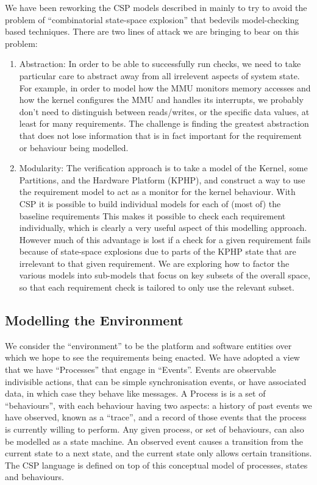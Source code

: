 We have been reworking the CSP models described in \cite{KH-MCS2016}
mainly to try to avoid the problem of ``combinatorial state-space explosion''
that bedevils model-checking based techniques.
There are two lines of attack we are bringing to bear on this problem:
\begin{enumerate}
  \item Abstraction:
   In order to be able to successfully run checks,
   we need to take particular care to abstract away from all irrelevent
   aspects of system state.
   For example, in order to model how the MMU monitors memory accesses
   and how the kernel configures the MMU and handles its interrupts,
   we probably don't need to distinguish between reads/writes,
   or the specific data values, at least for many requirements.
   The challenge is finding the greatest abstraction that does not lose  information
   that is in fact important for the requirement or behaviour being modelled.
  \item Modularity:
    The verification approach is to take a model of the Kernel, some Partitions,
    and the Hardware Platform (KPHP),
    and construct a way to use the requirement model
    to act as a monitor for the kernel behaviour.
    With CSP it is possible to build individual models for each of (most of)
    the baseline requirements
    This makes it possible to check each requirement individually,
    which is clearly a very useful aspect of this modelling approach.
    However much of this advantage is lost if a check for a given requirement
    fails because of state-space explosions
    due to parts of the KPHP state
    that are irrelevant to that given requirement.
    We are exploring how to factor the various models into sub-models
    that focus on key subsets of the overall space,
    so that each requirement check is tailored to only use the relevant subset.
\end{enumerate}

\subsection{Modelling the Environment}

We consider the ``environment'' to be the platform and software entities
over which we hope to see the requirements being enacted.
We have adopted a view that we have ``Processes''
that engage in ``Events''. Events are observable indivisible actions,
that can be simple synchronisation events,
or have associated data, in which case they behave like messages.
A Process is is a set of ``behaviours'',
with each behaviour having two aspects:
a history of past events we have observed, known as a ``trace'',
and a record of those events that the process is currently willing to perform.
Any given process, or set of behaviours, can also be modelled as a state machine.
An observed event causes a transition from the current state to a next state,
and the current state only allows certain transitions.
The CSP language is defined on top of this conceptual model of processes, states
and behaviours.


